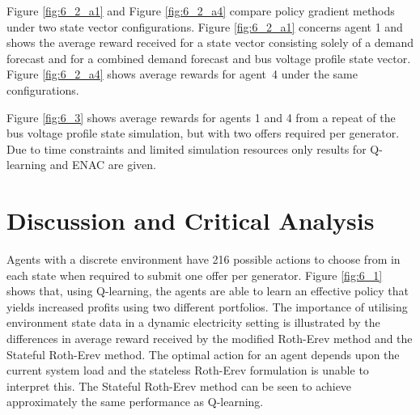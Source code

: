Figure \ref{fig:6_2_a1} and Figure \ref{fig:6_2_a4} compare policy gradient
methods under two state vector configurations.  Figure \ref{fig:6_2_a1} concerns
agent 1 and shows the average reward received for a state vector consisting
solely of a demand forecast and for a combined demand forecast and bus voltage
profile state vector.  Figure \ref{fig:6_2_a4} shows average rewards for
agent~4 under the same configurations.


Figure \ref{fig:6_3} shows average rewards for agents 1 and 4 from a repeat of
the bus voltage profile state simulation, but with two offers required per
generator.  Due to time constraints and limited simulation resources only
results for Q-learning and ENAC are given.

\section{Discussion and Critical Analysis}
\label{sec:discuss}
Agents with a discrete environment have 216 possible actions to choose from in
each state when required to submit one offer per generator.  Figure
\ref{fig:6_1} shows that, using Q-learning, the agents are able to learn an
effective policy that yields increased profits using two different portfolios.
The importance of utilising environment state data in a dynamic electricity
setting is illustrated by the differences in average reward received by the
modified Roth-Erev method and the Stateful Roth-Erev method.  The optimal action
for an agent depends upon the current system load and the stateless Roth-Erev
formulation is unable to interpret this.  The Stateful Roth-Erev method can be
seen to achieve approximately the same performance as Q-learning.

